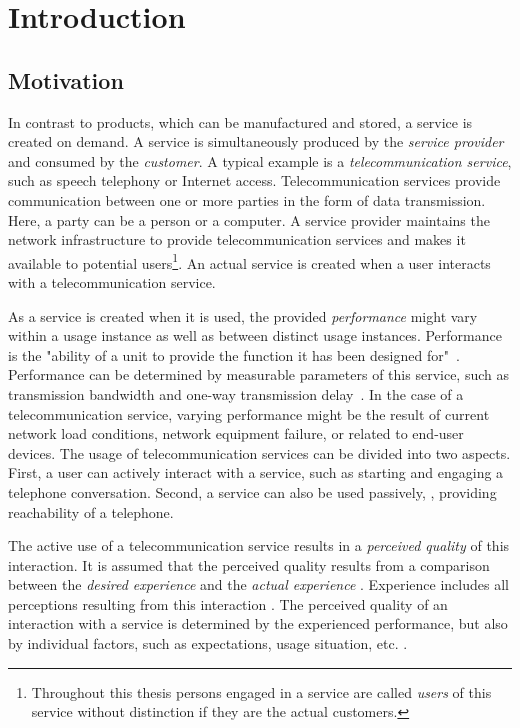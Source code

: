 \chapter{Introduction}\label{chap:01}

\section{Motivation}
In contrast to products, which can be manufactured and stored, a service is created on demand.
A service is simultaneously produced by the \emph{service provider} and consumed by the \emph{customer}.
A typical example is a \emph{telecommunication service}, such as speech telephony or Internet access.
Telecommunication services provide communication between one or more parties in the form of data transmission.
Here, a party can be a person or a computer.
A service provider maintains the network infrastructure to provide telecommunication services and makes it available to potential users\footnote{Throughout this thesis persons engaged in a service are called \emph{users} of this service without distinction if they are the actual customers.}.
An actual service is created when a user interacts with a telecommunication service.

As a service is created when it is used, the provided \emph{performance} might vary within a usage instance as well as between distinct usage instances.
Performance is the "ability of a unit to provide the function it has been designed for"~\citep[][p.\,360]{moller_quality_2005}.
Performance can be determined by measurable parameters of this service, such as transmission bandwidth and one-way transmission delay~\citep[][p.\,12]{moller_assessment_2000}.
In the case of a telecommunication service, varying performance might be the result of current network load conditions, network equipment failure, or related to end-user devices.
The usage of telecommunication services can be divided into two aspects.
First, a user can actively interact with a service, such as starting and engaging a telephone conversation.
Second, a service can also be used passively, \eg, providing reachability of a telephone.

The active use of a telecommunication service results in a \emph{perceived quality} of this interaction.
It is assumed that the perceived quality results from a comparison between the \emph{desired experience} and the \emph{actual experience} \citep[][p.\,13]{raake_quality_2014}. %
Experience includes all perceptions resulting from this interaction \citep[][p.\,13]{raake_quality_2014}.
The perceived quality of an interaction with a service is determined by the experienced performance, but also by individual factors, such as expectations, usage situation, etc. \citep[\eg,][p.\,55ff.]{reiter_factors_2014}.

